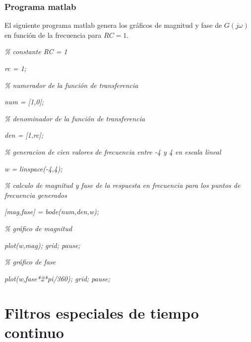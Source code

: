 \subsubsection{Programa matlab}

El siguiente programa matlab genera los gr\'{a}ficos de magnitud y fase de $G\left( j\omega \right) $ 
en funci\'{o}n de la frecuencia para $RC=1$.

\textit{\% constante RC = 1}

\textit{rc = 1;}

\textit{\% numerador de la funci\'{o}n de transferencia}

\textit{num = [1,0];}

\textit{\% denominador de la funci\'{o}n de transferencia}

\textit{den = [1,rc];}

\textit{\% generacion de cien valores de frecuencia entre -4 y 4 en escala
lineal}

\textit{w = linspace(-4,4);}

\textit{\% calculo de magnitud y fase de la respuesta en frecuencia para los
puntos de frecuencia generados}

\textit{[mag,fase] = bode(num,den,w);}

\textit{\% gr\'{a}fico de magnitud}

\textit{plot(w,mag); grid; pause;}

\textit{\% gr\'{a}fico de fase}

\textit{plot(w,fase*2*pi/360); grid; pause;}

\section{Filtros especiales de tiempo continuo}

